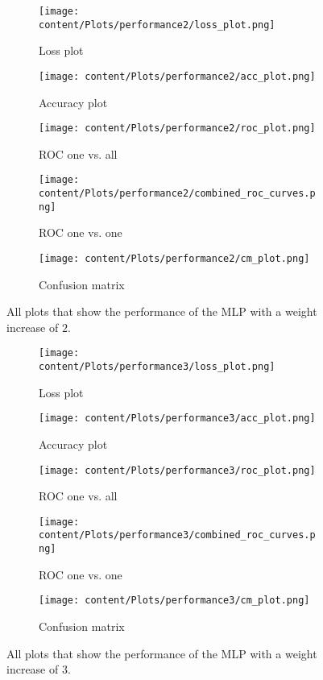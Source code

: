 \begin{figure}[htbp]
    \centering
    \begin{subfigure}{0.45\textwidth}
        \centering
        \texttt{[image: content/Plots/performance2/loss\_plot.png]}
        \caption{Loss plot}
    \end{subfigure}
    \hfill
    \begin{subfigure}{0.45\textwidth}
        \centering
        \texttt{[image: content/Plots/performance2/acc\_plot.png]}
        \caption{Accuracy plot}
    \end{subfigure}
    \begin{subfigure}{0.45\textwidth}
        \centering
        \texttt{[image: content/Plots/performance2/roc\_plot.png]}
        \caption{ROC one vs. all}
    \end{subfigure}
    \begin{subfigure}{0.45\textwidth}
        \centering
        \texttt{[image: content/Plots/performance2/combined\_roc\_curves.png]}
        \caption{ROC one vs. one}
    \end{subfigure}
    \begin{subfigure}{0.45\textwidth}
        \centering
        \texttt{[image: content/Plots/performance2/cm\_plot.png]}
        \caption{Confusion matrix}
    \end{subfigure}
    \caption{All plots that show the performance of the MLP with a weight increase of $2$.}
\end{figure}

\begin{figure}[htbp]
    \centering
    \begin{subfigure}{0.45\textwidth}
        \centering
        \texttt{[image: content/Plots/performance3/loss\_plot.png]}
        \caption{Loss plot}
    \end{subfigure}
    \hfill
    \begin{subfigure}{0.45\textwidth}
        \centering
        \texttt{[image: content/Plots/performance3/acc\_plot.png]}
        \caption{Accuracy plot}
    \end{subfigure}
    \begin{subfigure}{0.45\textwidth}
        \centering
        \texttt{[image: content/Plots/performance3/roc\_plot.png]}
        \caption{ROC one vs. all}
    \end{subfigure}
    \begin{subfigure}{0.45\textwidth}
        \centering
        \texttt{[image: content/Plots/performance3/combined\_roc\_curves.png]}
        \caption{ROC one vs. one}
    \end{subfigure}
    \begin{subfigure}{0.45\textwidth}
        \centering
        \texttt{[image: content/Plots/performance3/cm\_plot.png]}
        \caption{Confusion matrix}
    \end{subfigure}
    \caption{All plots that show the performance of the MLP with a weight increase of $3$.}
\end{figure}


